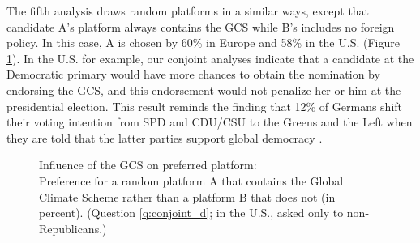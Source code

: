 The fifth analysis draws random platforms in a similar ways, except that candidate A's platform always contains the GCS while B's includes no foreign policy. In this case, A is chosen by 60\% in Europe %
and 58\% in the U.S. (Figure \ref{fig:conjoint_left_ag_b}). %
In the U.S. for example, our conjoint analyses indicate that a candidate at the Democratic primary would have more chances to obtain the nomination by endorsing the GCS, and this endorsement would not penalize her or him at the presidential election. This result reminds the finding that 12\% of Germans shift their voting intention from SPD and CDU/CSU to the Greens and the Left when they are told that the latter parties support global democracy \citep{ghassim_who_2020}.

\begin{figure}[h!]
    \caption[Influence of the GCS on preferred platform]{Influence of the GCS on preferred platform:\\ Preference for a random platform A that contains the Global Climate Scheme rather than a platform B that does not (in percent). (Question \ref{q:conjoint_d}; in the U.S., asked only to non-Republicans.)}\label{fig:conjoint_left_ag_b}
\end{figure}



